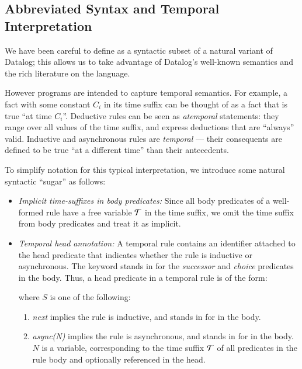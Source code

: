   


\subsection{Abbreviated Syntax and Temporal Interpretation}
We have been careful to define \slang as a syntactic subset of a
natural variant of Datalog; this allows us to take advantage of
Datalog's well-known semantics and the rich literature on the
language.

However \slang programs are intended to capture 
temporal semantics.  For example, a fact with some constant $C_i$ in its time
suffix can be thought of as a fact that is true ``at time $C_i$''.  Deductive
rules can be seen as {\em atemporal} statements: they range over all values of
the time suffix, and express deductions that are ``always'' valid.  Inductive
and asynchronous rules are {\em temporal} --- their consequents are defined to
be true ``at a different time'' than their antecedents. 

To simplify \slang notation for this typical interpretation,  we introduce
some natural syntactic ``sugar'' as follows:  

\begin{itemize}
%
%
\item {\em Implicit time-suffixes in body predicates:} Since all body
predicates of a well-formed rule have a free variable $\Tau$ in the time
suffix, we omit the time suffix from body predicates and treat it as implicit.
%
\item {\em Temporal head annotation:} A temporal rule contains an identifier
attached to the head predicate that indicates whether the rule is inductive or
asynchronous.  The keyword stands in for the {\em successor} and {\em choice}
predicates in the body.  Thus, a head predicate in a temporal rule is of the 
form:


where $S$ is one of the following:
%
\begin{enumerate}
%
\item \emph{next} implies the rule is inductive, and stands in for
 in the body.
%
\item \emph{async(N)} implies the rule is asynchronous, and stands in for
 in the body.  $N$ is a variable,
corresponding to the time suffix $\Tau$ of all predicates in the rule body and
optionally referenced in the head.  
%
\end{enumerate}
%
\end{itemize}

